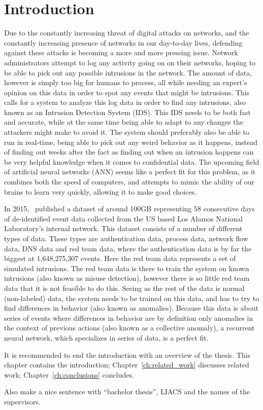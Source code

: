 \chapter{Introduction}\label{ch:introduction}
Due to the constantly increasing threat of digital attacks on networks, and the constantly increasing presence of networks in our day-to-day lives, defending against these attacks is becoming a more and more pressing issue. Network administrators attempt to log any activity going on on their networks, hoping to be able to pick out any possible intrusions in the network. The amount of data, however is simply too big for humans to process, all while needing an expert's opinion on this data in order to spot any events that might be intrusions. This calls for a system to analyze this log data in order to find any intrusions, also known as an Intrusion Detection System (IDS). This IDS needs to be both fast and accurate, while at the same time being able to adapt to any changes the attackers might make to avoid it. The system should preferably also be able to run in real-time, being able to pick out any weird behavior as it happens, instead of finding out weeks after the fact as finding out when an intrusion happens can be very helpful knowledge when it comes to confidential data. The upcoming field of artificial neural networks (ANN) seems like a perfect fit for this problem, as it combines both the speed of computers, and attempts to mimic the ability of our brains to learn very quickly, allowing it to make good choices.

In 2015,~\cite{akent-2015-enterprise-data} published a dataset of around 100GB representing 58 consecutive days of de-identified event data collected from the US based Los Alamos National Laboratory's internal network. This dataset consists of a number of different types of data. These types are authentication data, process data, network flow data, DNS data and red team data, where the authentication data is by far the biggest at 1,648,275,307 events. Here the red team data represents a set of simulated intrusions. The red team data is there to train the system on known intrusions (also known as misuse detection), however there is so little red team data that it is not feasible to do this. Seeing as the rest of the data is normal (non-labeled) data, the system needs to be trained on this data, and has to try to find differences in behavior (also known as anomalies). Because this data is about series of events where differences in behavior are by definition only anomalies in the context of previous actions (also known as a collective anomaly), a recurrent neural network, which specializes in series of data, is a perfect fit.

It is recommended to end the introduction with an overview of the thesis. This chapter contains the introduction; Chapter~\ref{ch:related_work} discusses related work; Chapter~\ref{ch:conclusions} concludes.

Also make a nice sentence with ``bachelor thesis'', LIACS and the names of the supervisors.
